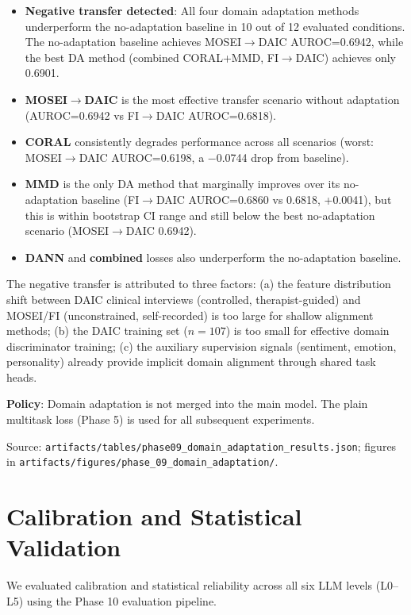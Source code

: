 \documentclass[12pt,oneside]{book}
\begin{document}
\begin{itemize}
\begin{itemize}
    \item \textbf{Negative transfer detected}: All four domain adaptation methods underperform the no-adaptation baseline in 10 out of 12 evaluated conditions. The no-adaptation baseline achieves MOSEI$\to$DAIC AUROC=0.6942, while the best DA method (combined CORAL+MMD, FI$\to$DAIC) achieves only 0.6901.
    \item \textbf{MOSEI$\to$DAIC} is the most effective transfer scenario without adaptation (AUROC=0.6942 vs FI$\to$DAIC AUROC=0.6818).
    \item \textbf{CORAL} consistently degrades performance across all scenarios (worst: MOSEI$\to$DAIC AUROC=0.6198, a $-$0.0744 drop from baseline).
    \item \textbf{MMD} is the only DA method that marginally improves over its no-adaptation baseline (FI$\to$DAIC AUROC=0.6860 vs 0.6818, +0.0041), but this is within bootstrap CI range and still below the best no-adaptation scenario (MOSEI$\to$DAIC 0.6942).
    \item \textbf{DANN} and \textbf{combined} losses also underperform the no-adaptation baseline.
\end{itemize}

The negative transfer is attributed to three factors: (a) the feature distribution shift between DAIC clinical interviews (controlled, therapist-guided) and MOSEI/FI (unconstrained, self-recorded) is too large for shallow alignment methods; (b) the DAIC training set ($n=107$) is too small for effective domain discriminator training; (c) the auxiliary supervision signals (sentiment, emotion, personality) already provide implicit domain alignment through shared task heads.

\textbf{Policy}: Domain adaptation is not merged into the main model. The plain multitask loss (Phase 5) is used for all subsequent experiments.

Source: \texttt{artifacts/tables/phase09\_domain\_adaptation\_results.json}; figures in \texttt{artifacts/figures/phase\_09\_domain\_adaptation/}.

\section{Calibration and Statistical Validation}
\label{sec:calibration}
We evaluated calibration and statistical reliability across all six LLM levels (L0--L5) using the Phase 10 evaluation pipeline.


\end{itemize}
\end{document}
